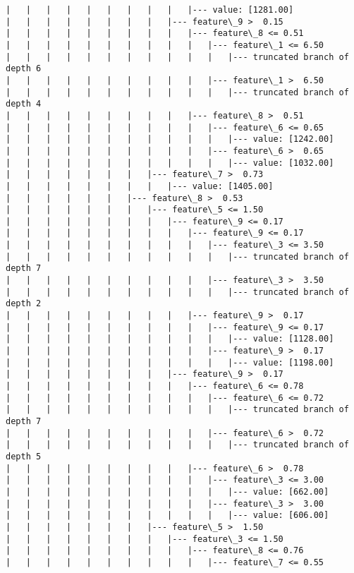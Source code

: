 \documentclass[11pt]{article}
\begin{document}
\begin{Verbatim}[commandchars=\\\{\}]
|   |   |   |   |   |   |   |   |   |--- value: [1281.00]
|   |   |   |   |   |   |   |   |--- feature\_9 >  0.15
|   |   |   |   |   |   |   |   |   |--- feature\_8 <= 0.51
|   |   |   |   |   |   |   |   |   |   |--- feature\_1 <= 6.50
|   |   |   |   |   |   |   |   |   |   |   |--- truncated branch of depth 6
|   |   |   |   |   |   |   |   |   |   |--- feature\_1 >  6.50
|   |   |   |   |   |   |   |   |   |   |   |--- truncated branch of depth 4
|   |   |   |   |   |   |   |   |   |--- feature\_8 >  0.51
|   |   |   |   |   |   |   |   |   |   |--- feature\_6 <= 0.65
|   |   |   |   |   |   |   |   |   |   |   |--- value: [1242.00]
|   |   |   |   |   |   |   |   |   |   |--- feature\_6 >  0.65
|   |   |   |   |   |   |   |   |   |   |   |--- value: [1032.00]
|   |   |   |   |   |   |   |--- feature\_7 >  0.73
|   |   |   |   |   |   |   |   |--- value: [1405.00]
|   |   |   |   |   |   |--- feature\_8 >  0.53
|   |   |   |   |   |   |   |--- feature\_5 <= 1.50
|   |   |   |   |   |   |   |   |--- feature\_9 <= 0.17
|   |   |   |   |   |   |   |   |   |--- feature\_9 <= 0.17
|   |   |   |   |   |   |   |   |   |   |--- feature\_3 <= 3.50
|   |   |   |   |   |   |   |   |   |   |   |--- truncated branch of depth 7
|   |   |   |   |   |   |   |   |   |   |--- feature\_3 >  3.50
|   |   |   |   |   |   |   |   |   |   |   |--- truncated branch of depth 2
|   |   |   |   |   |   |   |   |   |--- feature\_9 >  0.17
|   |   |   |   |   |   |   |   |   |   |--- feature\_9 <= 0.17
|   |   |   |   |   |   |   |   |   |   |   |--- value: [1128.00]
|   |   |   |   |   |   |   |   |   |   |--- feature\_9 >  0.17
|   |   |   |   |   |   |   |   |   |   |   |--- value: [1198.00]
|   |   |   |   |   |   |   |   |--- feature\_9 >  0.17
|   |   |   |   |   |   |   |   |   |--- feature\_6 <= 0.78
|   |   |   |   |   |   |   |   |   |   |--- feature\_6 <= 0.72
|   |   |   |   |   |   |   |   |   |   |   |--- truncated branch of depth 7
|   |   |   |   |   |   |   |   |   |   |--- feature\_6 >  0.72
|   |   |   |   |   |   |   |   |   |   |   |--- truncated branch of depth 5
|   |   |   |   |   |   |   |   |   |--- feature\_6 >  0.78
|   |   |   |   |   |   |   |   |   |   |--- feature\_3 <= 3.00
|   |   |   |   |   |   |   |   |   |   |   |--- value: [662.00]
|   |   |   |   |   |   |   |   |   |   |--- feature\_3 >  3.00
|   |   |   |   |   |   |   |   |   |   |   |--- value: [606.00]
|   |   |   |   |   |   |   |--- feature\_5 >  1.50
|   |   |   |   |   |   |   |   |--- feature\_3 <= 1.50
|   |   |   |   |   |   |   |   |   |--- feature\_8 <= 0.76
|   |   |   |   |   |   |   |   |   |   |--- feature\_7 <= 0.55

\end{Verbatim}
\end{document}
